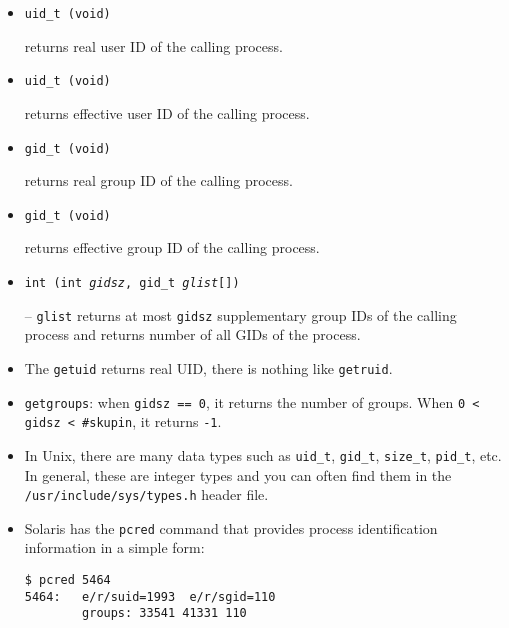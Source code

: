 \begin{slide}
\begin{itemize}
\item \texttt{uid\_t (void)}

returns real user ID of the calling process.
\item \texttt{uid\_t (void)}

returns effective user ID of the calling process.
\item \texttt{gid\_t (void)}

returns real group ID of the calling process.
\item \texttt{gid\_t (void)}

returns effective group ID of the calling process.
\item \texttt{int (int \emph{gidsz}, gid\_t \emph{glist}[])}

-- \texttt{glist} returns at most \texttt{gidsz} supplementary group
IDs of the calling process and returns number of all GIDs of the process.
\end{itemize}
\end{slide}

\begin{itemize}
\item The \texttt{getuid} returns real UID, there is nothing like
\texttt{getruid}.
\item \texttt{getgroups}: when \texttt{gidsz~==~0}, it returns the number of
groups. When \texttt{0 < gidsz < \#skupin}, it returns \texttt{-1}.
\item In Unix, there are many data types such as \verb#uid_t#, \verb#gid_t#,
\verb#size_t#, \verb#pid_t#, etc.  In general, these are integer types and you
can often find them in the \texttt{/usr/inc{}lude/sys/types.h} header file.
\item Solaris has the \texttt{pcred} command that provides process
identification information in a simple form:

\begin{verbatim}
$ pcred 5464
5464:   e/r/suid=1993  e/r/sgid=110
        groups: 33541 41331 110
\end{verbatim}
\end{itemize}



